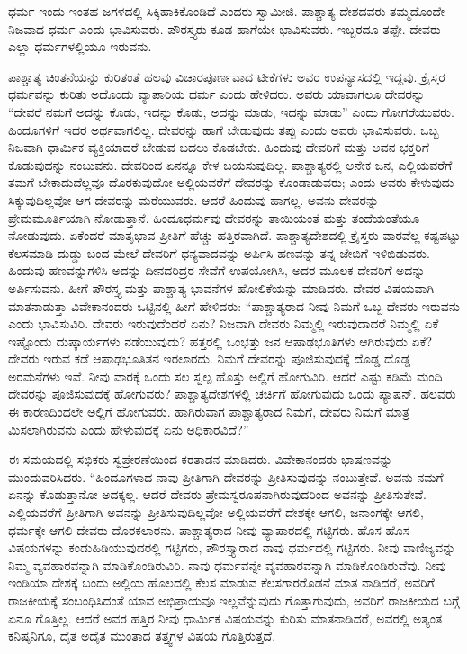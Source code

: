ಧರ್ಮ ಇಂದು ಇಂತಹ ಜಗಳದಲ್ಲಿ ಸಿಕ್ಕಿಹಾಕಿಕೊಂಡಿದೆ ಎಂದರು ಸ್ವಾಮೀಜಿ. ಪಾಶ್ಚಾತ್ಯ ದೇಶದವರು ತಮ್ಮದೊಂದೇ ನಿಜವಾದ ಧರ್ಮ ಎಂದು ಭಾವಿಸುವರು. ಪೌರಸ್ತ್ಯರು ಕೂಡ ಹಾಗೆಯೇ ಭಾವಿಸುವರು. ಇಬ್ಬರದೂ ತಪ್ಪೇ. ದೇವರು ಎಲ್ಲಾ ಧರ್ಮಗಳಲ್ಲಿಯೂ ಇರುವನು.

ಪಾಶ್ಚಾತ್ಯ ಚಿಂತನೆಯನ್ನು ಕುರಿತಂತೆ ಹಲವು ವಿಚಾರಪೂರ್ಣವಾದ ಟೀಕೆಗಳು ಅವರ ಉಪನ್ಯಾಸದಲ್ಲಿ ಇದ್ದವು. ಕ್ರೈಸ್ತರ ಧರ್ಮವನ್ನು ಕುರಿತು ಅದೊಂದು ವ್ಯಾಪಾರಿಯ ಧರ್ಮ ಎಂದು ಹೇಳಿದರು. ಅವರು ಯಾವಾಗಲೂ ದೇವರನ್ನು “ದೇವರೆ ನಮಗೆ ಅದನ್ನು ಕೊಡು, ಇದನ್ನು ಕೊಡು, ಅದನ್ನು ಮಾಡು, ಇದನ್ನು ಮಾಡು” ಎಂದು ಗೋಗರೆಯುವರು. ಹಿಂದೂಗಳಿಗೆ ಇದರ ಅರ್ಥವಾಗಲಿಲ್ಲ. ದೇವರನ್ನು ಹಾಗೆ ಬೇಡುವುದು ತಪ್ಪು ಎಂದು ಅವರು ಭಾವಿಸುವರು. ಒಬ್ಬ ನಿಜವಾಗಿ ಧಾರ್ಮಿಕ ವ್ಯಕ್ತಿಯಾದರೆ ಬೇಡುವ ಬದಲು ಕೊಡಬೇಕು. ಹಿಂದುವು ದೇವರಿಗೆ ಮತ್ತು ಅವನ ಭಕ್ತರಿಗೆ ಕೊಡುವುದನ್ನು ನಂಬುವನು. ದೇವರಿಂದ ಏನನ್ನೂ ಕೇಳ ಬಯಸುವುದಿಲ್ಲ. ಪಾಶ್ಚಾತ್ಯರಲ್ಲಿ ಅನೇಕ ಜನ, ಎಲ್ಲಿಯವರೆಗೆ ತಮಗೆ ಬೇಕಾದುದೆಲ್ಲವೂ ದೊರಕುವುದೋ ಅಲ್ಲಿಯವರೆಗೆ ದೇವರನ್ನು ಕೊಂಡಾಡುವರು; ಎಂದು ಅವರು ಕೇಳುವುದು ಸಿಕ್ಕುವುದಿಲ್ಲವೋ ಆಗ ದೇವರನ್ನು ಮರೆಯುವರು. ಆದರೆ ಹಿಂದುವು ಹಾಗಲ್ಲ. ಅವನು ದೇವರನ್ನು ಪ್ರೇಮಮೂರ್ತಿಯಾಗಿ ನೋಡುತ್ತಾನೆ. ಹಿಂದೂಧರ್ಮವು ದೇವರನ್ನು ತಾಯಿಯಂತೆ ಮತ್ತು ತಂದೆಯಂತೆಯೂ ನೋಡುವುದು. ಏಕೆಂದರೆ ಮಾತೃಭಾವ ಪ್ರೀತಿಗೆ ಹೆಚ್ಚು ಹತ್ತಿರವಾಗಿದೆ. ಪಾಶ್ಚಾತ್ಯದೇಶದಲ್ಲಿ ಕ್ರೈಸ್ತರು ವಾರವೆಲ್ಲ ಕಷ್ಟಪಟ್ಟು ಕೆಲಸಮಾಡಿ ದುಡ್ಡು ಬಂದ ಮೇಲೆ ದೇವರಿಗೆ ಧನ್ಯವಾದವನ್ನು ಅರ್ಪಿಸಿ ಹಣವನ್ನು ತನ್ನ ಜೇಬಿಗೆ ಇಳಿಬಿಡುವರು. ಹಿಂದುವು ಹಣವನ್ನುಗಳಿಸಿ ಅದನ್ನು ದೀನದರಿದ್ರರ ಸೇವೆಗೆ ಉಪಯೋಗಿಸಿ, ಅದರ ಮೂಲಕ ದೇವರಿಗೆ ಅದನ್ನು ಅರ್ಪಿಸುವನು. ಹೀಗೆ ಪೌರಸ್ತ್ಯ ಮತ್ತು ಪಾಶ್ಚಾತ್ಯ ಭಾವನೆಗಳ ಹೋಲಿಕೆಯನ್ನು ಮಾಡಿದರು. ದೇವರ ವಿಷಯವಾಗಿ ಮಾತನಾಡುತ್ತಾ ವಿವೇಕಾನಂದರು ಒಟ್ಟಿನಲ್ಲಿ ಹೀಗೆ ಹೇಳಿದರು: “ಪಾಶ್ಚಾತ್ಯರಾದ ನೀವು ನಿಮಗೆ ಒಬ್ಬ ದೇವರು ಇರುವನು ಎಂದು ಭಾವಿಸುವಿರಿ. ದೇವರು ಇರುವುದೆಂದರೆ ಏನು? ನಿಜವಾಗಿ ದೇವರು ನಿಮ್ಮಲ್ಲಿ ಇರುವುದಾದರೆ ನಿಮ್ಮಲ್ಲಿ ಏಕೆ ಇಷ್ಟೊಂದು ದುಷ್ಕಾರ್ಯಗಳು ನಡೆಯುವುದು? ಹತ್ತರಲ್ಲಿ ಒಂಭತ್ತು ಜನ ಆಷಾಢಭೂತಿಗಳು ಆಗಿರುವುದು ಏಕೆ? ದೇವರು ಇರುವ ಕಡೆ ಆಷಾಢಭೂತಿತನ ಇರಲಾರದು. ನಿಮಗೆ ದೇವರನ್ನು ಪೂಜಿಸುವುದಕ್ಕೆ ದೊಡ್ಡ ದೊಡ್ಡ ಅರಮನೆಗಳು ಇವೆ. ನೀವು ವಾರಕ್ಕೆ ಒಂದು ಸಲ ಸ್ವಲ್ಪ ಹೊತ್ತು ಅಲ್ಲಿಗೆ ಹೋಗುವಿರಿ. ಆದರೆ ಎಷ್ಟು ಕಡಿಮೆ ಮಂದಿ ದೇವರನ್ನು ಪೂಜಿಸುವುದಕ್ಕೆ ಹೋಗುವರು? ಪಾಶ್ಚಾತ್ಯದೇಶಗಳಲ್ಲಿ ಚರ್ಚಿಗೆ ಹೋಗುವುದು ಒಂದು ಪ್ಯಾಷನ್. ಹಲವರು ಈ ಕಾರಣದಿಂದಲೇ ಅಲ್ಲಿಗೆ ಹೋಗುವರು. ಹಾಗಿರುವಾಗ ಪಾಶ್ಚಾತ್ಯರಾದ ನಿಮಗೆ, ದೇವರು ನಿಮಗೆ ಮಾತ್ರ ಮಿಸಲಾಗಿರುವನು ಎಂದು ಹೇಳುವುದಕ್ಕೆ ಏನು ಅಧಿಕಾರವಿದೆ?''

ಈ ಸಮಯದಲ್ಲಿ ಸಭಿಕರು ಸ್ವಪ್ರೇರಣೆಯಿಂದ ಕರತಾಡನ ಮಾಡಿದರು. ವಿವೇಕಾ\break ನಂದರು ಭಾಷಣವನ್ನು ಮುಂದುವರಿಸಿದರು. “ಹಿಂದೂಗಳಾದ ನಾವು ಪ್ರೀತಿಗಾಗಿ ದೇವರನ್ನು ಪ್ರೀತಿಸುವುದನ್ನು ನಂಬುತ್ತೇವೆ. ಅವನು ನಮಗೆ ಏನನ್ನು ಕೊಡುತ್ತಾನೋ ಅದಕ್ಕಲ್ಲ. ಆದರೆ ದೇವರು ಪ್ರೇಮಸ್ವರೂಪನಾಗಿರುವುದರಿಂದ ಅವನನ್ನು ಪ್ರೀತಿಸುತೇವೆ. ಎಲ್ಲಿಯವರೆಗೆ ಪ್ರೀತಿಗಾಗಿ ಅವನನ್ನು ಪ್ರೀತಿಸುವುದಿಲ್ಲವೋ ಅಲ್ಲಿಯವರೆಗೆ ದೇಶಕ್ಕೇ ಆಗಲಿ, ಜನಾಂಗಕ್ಕೇ ಆಗಲಿ, ಧರ್ಮಕ್ಕೇ ಆಗಲಿ ದೇವರು ದೊರಕಲಾರನು. ಪಾಶ್ಚಾತ್ಯರಾದ ನೀವು ವ್ಯಾಪಾರದಲ್ಲಿ ಗಟ್ಟಿಗರು. ಹೊಸ ಹೊಸ ವಿಷಯಗಳನ್ನು ಕಂಡುಹಿಡಿಯುವುದರಲ್ಲಿ ಗಟ್ಟಿಗರು, ಪೌರಸ್ತ್ಯಾರಾದ ನಾವು ಧರ್ಮದಲ್ಲಿ ಗಟ್ಟಿಗರು. ನೀವು ವಾಣಿಜ್ಯವನ್ನು ನಿಮ್ಮ ವ್ಯವಹಾರವನ್ನಾಗಿ ಮಾಡಿಕೊಂಡಿರುವಿರಿ. ನಾವು ಧರ್ಮವನ್ನೇ ವ್ಯವಹಾರವನ್ನಾಗಿ ಮಾಡಿಕೊಂಡಿರುವೆವು. ನೀವು ಇಂಡಿಯಾ ದೇಶಕ್ಕೆ ಬಂದು ಅಲ್ಲಿಯ ಹೊಲದಲ್ಲಿ ಕೆಲಸ ಮಾಡುವ ಕೆಲಸಗಾರರೊಡನೆ ಮಾತ ನಾಡಿದರೆ, ಅವರಿಗೆ ರಾಜಕೀಯಕ್ಕೆ ಸಂಬಂಧಿಸಿದಂತೆ ಯಾವ ಅಭಿಪ್ರಾಯವೂ ಇಲ್ಲವೆನ್ನುವುದು ಗೊತ್ತಾಗುವುದು, ಅವರಿಗೆ ರಾಜಕೀಯದ ಬಗ್ಗೆ ಏನೂ ಗೊತ್ತಿಲ್ಲ. ಆದರೆ ಅವರ ಹತ್ತಿರ ನೀವು ಧಾರ್ಮಿಕ ವಿಷಯವನ್ನು ಕುರಿತು ಮಾತನಾಡಿದರೆ, ಅವರಲ್ಲಿ ಅತ್ಯಂತ ಕನಿಷ್ಕನಿಗೂ, ದೈತ ಅದೈತ ಮುಂತಾದ ತತ್ತ್ವಗಳ ವಿಷಯ ಗೊತ್ತಿರುತ್ತದೆ.

